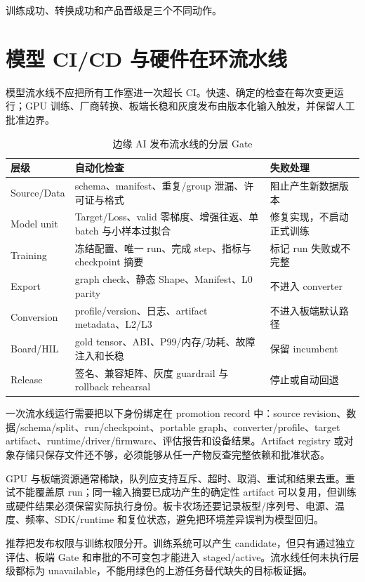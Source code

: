 训练成功、转换成功和产品晋级是三个不同动作。

\section{模型 CI/CD 与硬件在环流水线}

模型流水线不应把所有工作塞进一次超长 CI。快速、确定的检查在每次变更运行；GPU 训练、厂商转换、板端长稳和灰度发布由版本化输入触发，并保留人工批准边界。

\begin{table}[H]
  \centering
  \caption{边缘 AI 发布流水线的分层 Gate}
  \begin{tabular}{p{26mm}p{55mm}p{51mm}}
    \hline
    层级 & 自动化检查 & 失败处理 \\
    \hline
    Source/Data & schema、manifest、重复/group 泄漏、许可证与格式 & 阻止产生新数据版本 \\
    Model unit & Target/Loss、valid 零梯度、增强往返、单 batch 与小样本过拟合 & 修复实现，不启动正式训练 \\
    Training & 冻结配置、唯一 run、完成 step、指标与 checkpoint 摘要 & 标记 run 失败或不完整 \\
    Export & graph check、静态 Shape、Manifest、L0 parity & 不进入 converter \\
    Conversion & profile/version、日志、artifact metadata、L2/L3 & 不进入板端默认路径 \\
    Board/HIL & gold tensor、ABI、P99/内存/功耗、故障注入和长稳 & 保留 incumbent \\
    Release & 签名、兼容矩阵、灰度 guardrail 与 rollback rehearsal & 停止或自动回退 \\
    \hline
  \end{tabular}
\end{table}

一次流水线运行需要把以下身份绑定在 promotion record 中：source revision、数据/schema/split、run/checkpoint、portable graph、converter/profile、target artifact、runtime/driver/firmware、评估报告和设备结果。Artifact registry 或对象存储只保存文件还不够，必须能够从任一产物反查完整依赖和批准状态。

GPU 与板端资源通常稀缺，队列应支持互斥、超时、取消、重试和结果去重。重试不能覆盖原 run；同一输入摘要已成功产生的确定性 artifact 可以复用，但训练或硬件结果必须保留实际执行身份。板卡农场还要记录板型/序列号、电源、温度、频率、SDK/runtime 和复位状态，避免把环境差异误判为模型回归。

推荐把发布权限与训练权限分开。训练系统可以产生 candidate，但只有通过独立评估、板端 Gate 和审批的不可变包才能进入 staged/active。流水线任何未执行层级都标为 unavailable，不能用绿色的上游任务替代缺失的目标板证据。

